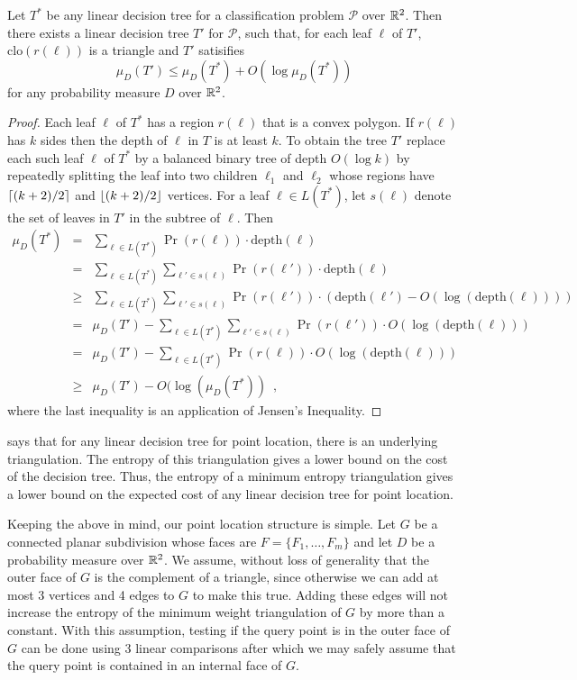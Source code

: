 \documentclass[lotsofwhite]{patmorin}
\newcommand{\closure}{\mathrm{clo}}
\newcommand{\depth}{\mathrm{depth}}
\begin{document}
\begin{lem}
Let $T^*$ be any linear decision tree for a classification problem
$\mathcal{P}$ over $\mathbb{R}^2$.  Then there exists a linear decision tree
$T'$ for $\mathcal{P}$, such that, for each leaf $\ell$ of $T'$,
$\closure(r(\ell))$ is a triangle and $T'$ satisifies
\[
    \mu_D(T') \le \mu_D(T^*) + O(\log\mu_D(T^*))
\]
for any probability measure $D$ over $\mathbb{R}^2$.
\end{lem}

\begin{proof}
Each leaf $\ell$ of $T^*$ has a region $r(\ell)$ that is a convex
polygon.  If $r(\ell)$ has $k$ sides then the depth of $\ell$ in $T$
is at least $k$.  To obtain the tree $T'$ replace each such leaf
$\ell$ of $T^*$ by a balanced binary tree of depth $O(\log k)$ by
repeatedly splitting the leaf into two children $\ell_1$ and $\ell_2$
whose regions have ${\left\lceil (k+2)/2 \right\rceil}$ and ${\left\lfloor (k+2)/2 \right\rfloor}$ vertices.
For a leaf $\ell\in L(T^*)$, let $s(\ell)$ denote the set of leaves in $T'$
in the subtree of $\ell$.   Then
\begin{eqnarray*}
   \mu_D(T^*) 
     &  =  & \sum_{\ell\in L(T^*)} \Pr(r(\ell))\cdot \depth(\ell) \\
     &  =  & \sum_{\ell\in L(T^*)}\sum_{\ell'\in s(\ell)} 
              \Pr(r(\ell'))\cdot \depth(\ell) \\
     & \ge & \sum_{\ell\in L(T^*)} 
             \sum_{\ell'\in s(\ell)}\Pr(r(\ell'))\cdot (\depth(\ell')
                   - O(\log (\depth(\ell)))) \\
     &  =  & \mu_D(T') - \sum_{\ell\in L(T^*)} 
             \sum_{\ell'\in s(\ell)}\Pr(r(\ell'))\cdot O(\log (\depth(\ell))) \\
     &  =  & \mu_D(T') - \sum_{\ell\in L(T^*)} 
             \Pr(r(\ell))\cdot O(\log (\depth(\ell))) \\
     & \ge & \mu_D(T') - O(\log(\mu_D(T^*)) \enspace , 
\end{eqnarray*}
where the last inequality is an application of Jensen's Inequality.
\end{proof}

 says that for any linear decision tree for point
location, there is an underlying triangulation.  The entropy of this
triangulation gives a lower bound on the cost of the decision tree.
Thus, the entropy of a minimum entropy triangulation gives a lower
bound on the expected cost of any linear decision tree for point
location.

Keeping the above in mind, our point location structure is simple.
Let $G$ be a connected planar subdivision whose faces are
$F=\{F_1,\ldots,F_m\}$ and let $D$ be a probability measure over
$\mathbb{R}^2$.  We assume, without loss of generality that the outer face of
$G$ is the complement of a triangle, since otherwise we can add at
most 3 vertices and 4 edges to $G$ to make this true.  Adding these
edges will not increase the entropy of the minimum weight triangulation
of $G$ by more than a constant.  With this assumption, testing if the
query point is in the outer face of $G$ can be done using 3 linear
comparisons after which we may safely assume that the query point is
contained in an internal face of $G$.
\end{document}
